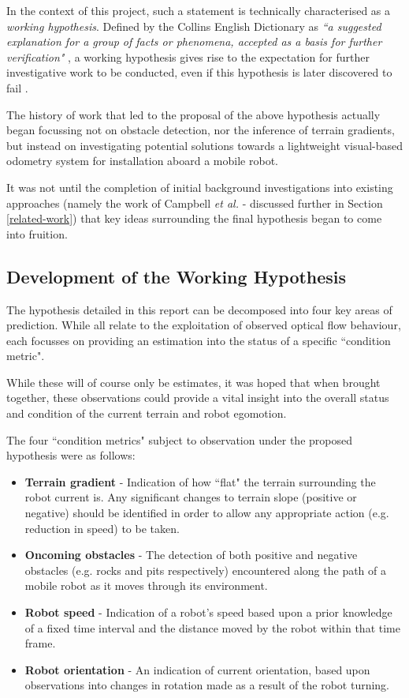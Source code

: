 In the context of this project, such a statement is technically characterised as a \textit{working hypothesis}. Defined by the Collins English Dictionary as \textit{``a suggested explanation for a group of facts or phenomena, accepted as a basis for further verification"} \cite{collins}, a working hypothesis gives rise to the expectation for further investigative work to be conducted, even if this hypothesis is later discovered to fail \cite{century}. 

The history of work that led to the proposal of the above hypothesis actually began focussing not on obstacle detection, nor the inference of terrain gradients, but instead on investigating potential solutions towards a lightweight visual-based odometry system for installation aboard a mobile robot. 

It was not until the completion of initial background investigations into existing approaches (namely the work of Campbell \textit{et al.} \cite{campbell} - discussed further in Section \ref{related-work}) that key ideas surrounding the final hypothesis began to come into fruition. 

\subsection{Development of the Working Hypothesis} 

The hypothesis detailed in this report can be decomposed into four key areas of prediction. While all relate to the exploitation of observed optical flow behaviour, each focusses on providing an estimation into the status of a specific ``condition metric". 

While these will of course only be estimates, it was hoped that when brought together, these observations could provide a vital insight into the overall status and condition of the current terrain and robot egomotion. 

The four ``condition metrics" subject to observation under the proposed hypothesis were as follows:

\begin{itemize}
	\item \textbf{Terrain gradient} - Indication of how ``flat" the terrain surrounding the robot current is. Any significant changes to terrain slope (positive or negative) should be identified in order to allow any appropriate action (e.g. reduction in speed) to be taken.
	\item  \textbf{Oncoming obstacles} - The detection of both positive and negative obstacles (e.g. rocks and pits respectively) encountered along the path of a mobile robot as it moves through its environment. 
	\item \textbf{Robot speed} - Indication of a robot's speed based upon a prior knowledge of a fixed time interval and the distance moved by the robot within that time frame.
	\item \textbf{Robot orientation} - An indication of current orientation, based upon observations into changes in rotation made as a result of the robot turning. 
	
\end{itemize} 

